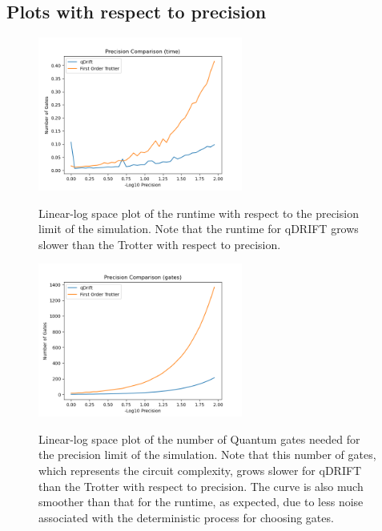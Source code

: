 \documentclass[letterpaper, 11pt]{article}
\begin{document}
\subsection*{Plots with respect to precision}
\begin{figure}[H]
\centering
\includegraphics[width = 0.6\textwidth]{plots/e_precision_time_comp.png}
\label{html}
\caption{Linear-log space plot of the runtime with respect to the precision limit of the simulation. Note that the runtime for qDRIFT grows slower than the Trotter with respect to precision.}
\end{figure}
\begin{figure}[H]
\centering
\includegraphics[width = 0.6\textwidth]{plots/e_precision_gates_comp.png}
\label{html}
\caption{Linear-log space plot of the number of Quantum gates needed for the precision limit of the simulation. Note that this number of gates, which represents the circuit complexity, grows slower for qDRIFT than the Trotter with respect to precision. The curve is also much smoother than that for the runtime, as expected, due to less noise associated with the deterministic process for choosing gates.}
\end{figure}
\end{document}

